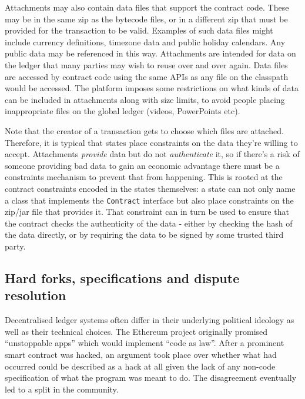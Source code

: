\documentclass{article}
\begin{document}
Attachments may also contain data files that support the contract code. These may be in the same zip as the
bytecode files, or in a different zip that must be provided for the transaction to be valid. Examples of such
data files might include currency definitions, timezone data and public holiday calendars. Any public data may
be referenced in this way. Attachments are intended for data on the ledger that many parties may wish to reuse
over and over again. Data files are accessed by contract code using the same APIs as any file on the classpath
would be accessed. The platform imposes some restrictions on what kinds of data can be included in attachments
along with size limits, to avoid people placing inappropriate files on the global ledger (videos, PowerPoints etc).


Note that the creator of a transaction gets to choose which files are attached. Therefore, it is typical that
states place constraints on the data they're willing to accept. Attachments \emph{provide} data but do not
\emph{authenticate} it, so if there's a risk of someone providing bad data to gain an economic advantage
there must be a constraints mechanism to prevent that from happening. This is rooted at the contract constraints
encoded in the states themselves: a state can not only name a class that implements the \texttt{Contract}
interface but also place constraints on the zip/jar file that provides it. That constraint can in turn be used to
ensure that the contract checks the authenticity of the data - either by checking the hash of the data directly,
or by requiring the data to be signed by some trusted third party.


\subsection{Hard forks, specifications and dispute resolution}

Decentralised ledger systems often differ in their underlying political ideology as well as their technical
choices. The Ethereum project originally promised ``unstoppable apps'' which would implement ``code as law''. After
a prominent smart contract was hacked, an argument took place over whether what had occurred could be described
as a hack at all given the lack of any non-code specification of what the program was meant to do. The disagreement
eventually led to a split in the community.
\end{document}
